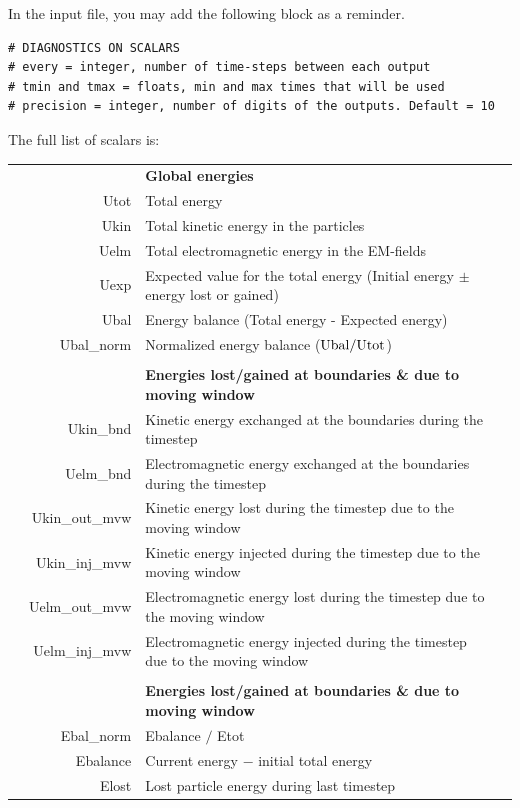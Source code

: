 \documentclass[11pt]{article}
\begin{document}
In the input file, you may add the following block as a reminder.
\begin{lstlisting}
# DIAGNOSTICS ON SCALARS
# every = integer, number of time-steps between each output
# tmin and tmax = floats, min and max times that will be used
# precision = integer, number of digits of the outputs. Default = 10
\end{lstlisting}

The full list of scalars is:\\
\vspace{-0.7em}

\begin{longtabu}{X r | l X}
&	 & {\bf Global energies}& \\
&Utot & Total energy& \\
&Ukin&  Total kinetic energy in the particles&\\
&Uelm& Total electromagnetic energy in the EM-fields&\\
&Uexp& Expected value for the total energy (Initial energy $\pm$ energy lost or gained)&\\
&Ubal& Energy balance (Total energy - Expected energy)&\\
&Ubal\_norm& Normalized energy balance (${\rm Ubal/Utot}$)&\\
& & & \\
&	 & {\bf Energies lost/gained at boundaries \& due to moving window}& \\
&Ukin\_bnd& Kinetic energy exchanged at the boundaries during the timestep &\\
&Uelm\_bnd& Electromagnetic energy exchanged at the boundaries during the timestep &\\
&Ukin\_out\_mvw& Kinetic energy lost during the timestep due to the moving window&\\
&Ukin\_inj\_mvw& Kinetic energy injected during the timestep due to the moving window&\\
&Uelm\_out\_mvw& Electromagnetic energy lost during the timestep due to the moving window&\\
&Uelm\_inj\_mvw& Electromagnetic energy injected during the timestep due to the moving window&\\
& & & \\
&	 & {\bf Energies lost/gained at boundaries \& due to moving window}& \\
& Ebal\_norm & Ebalance $/$ Etot &\\
& Ebalance & Current energy $-$ initial total energy&\\
& Elost & Lost particle energy during last timestep &\\

\end{longtabu}
\end{document}
